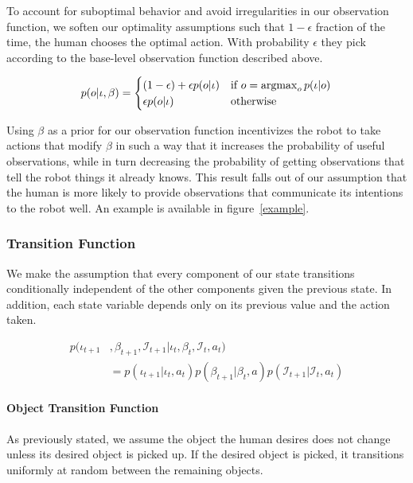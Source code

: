 \documentclass[conference]{IEEEtran}
\newcommand{\Iota}{\mathcal{I}}
\newcommand{\argmax}{\operatornamewithlimits{argmax}}
\begin{document}
To account for suboptimal behavior and avoid irregularities in our observation function, we soften our optimality assumptions such that $1-\epsilon$ fraction of the time, the human chooses the optimal action. With probability $\epsilon$ they pick according to the base-level observation function described above. 

\begin{equation*} 
	p(o | \iota, \beta) = \begin{cases}
		(1-\epsilon) + \epsilon p(o|\iota) & \text{if } o = \argmax_o p(\iota|o) \\
		\epsilon p(o|\iota) & \text{otherwise}
	\end{cases}
\end{equation*}

Using $\beta$ as a prior for our observation function incentivizes the robot to take actions that modify $\beta$ in such a way that it increases the probability of useful observations, while in turn decreasing the probability of getting observations that tell the robot things it already knows. This result falls out of our assumption that the human is more likely to provide observations that communicate its intentions to the robot well. An example is available in figure~\ref{example}.




\subsubsection{Transition Function} \label{sssec:tf}

We make the assumption that every component of our state transitions conditionally independent of the other components given the previous state. In addition, each state variable depends only on its previous value and the action taken. 

\begin{align*}
	p(\iota_{t+1}&, \beta_{t+1}, \Iota_{t+1} | \iota_t, \beta_t, \Iota_t, a_t) \\
	&=  p(\iota_{t+1} | \iota_t, a_t) p(\beta_{t+1} | \beta_t, a) p(\Iota_{t+1} | \Iota_t, a_t)
\end{align*}

\paragraph{Object Transition Function}
As previously stated, we assume the object the human desires does not change unless its desired object is picked up. If the desired object is picked, it transitions uniformly at random between the remaining objects. 
\end{document}
